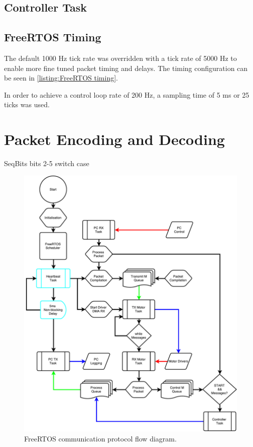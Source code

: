 \subsection{Controller Task}

\subsection{FreeRTOS Timing}

The default 1000 Hz tick rate was overridden with a tick rate of 5000 Hz to enable more fine tuned packet timing and delays. The timing configuration can be seen in \cref{listing:FreeRTOS timing}. 

In order to achieve a control loop rate of 200 Hz, a sampling time of 5 ms or 25 ticks was used.

\section{Packet Encoding and Decoding}

SeqBits bits 2-5 switch case

\begin{figure}
\centering
\includegraphics[width=1\textwidth]{images/comms/communication-flow-diagram.pdf} 
\caption{FreeRTOS communication protocol flow diagram.}
\label{fig:FreeRTOS communication protocol flow diagram.}
\end{figure}

